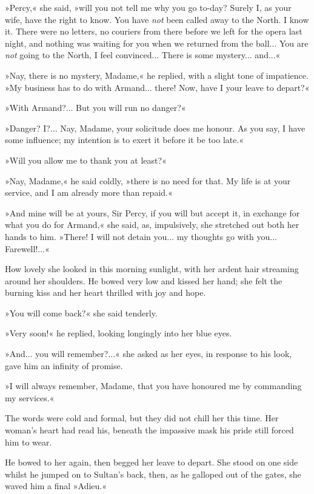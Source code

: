 »Percy,« she said, »will you not tell me why you go to-day? Surely I, as your wife, have the right to know. You have \textit{not} been called away to the North. I know it. There were no letters, no couriers from there before we left for the opera last night, and nothing was waiting for you when we returned from the ball... You are \textit{not} going to the North, I feel convinced... There is some mystery... and...«

»Nay, there is no mystery, Madame,« he replied, with a slight tone of impatience. »My business has to do with Armand... there! Now, have I your leave to depart?«

»With Armand?... But you will run no danger?«

»Danger? I?... Nay, Madame, your solicitude does me honour. As you say, I have some influence; my intention is to exert it before it be too late.«

»Will you allow me to thank you at least?«

»Nay, Madame,« he said coldly, »there is no need for that. My life is at your service, and I am already more than repaid.«

»And mine will be at yours, Sir Percy, if you will but accept it, in exchange for what you do for Armand,« she said, as, impulsively, she stretched out both her hands to him. »There! I will not detain you... my thoughts go with you... Farewell!...«

How lovely she looked in this morning sunlight, with her ardent hair streaming around her shoulders. He bowed very low and kissed her hand; she felt the burning kiss and her heart thrilled with joy and hope.

»You will come back?« she said tenderly.

»Very soon!« he replied, looking longingly into her blue eyes.

»And... you will remember?...« she asked as her eyes, in response to his look, gave him an infinity of promise.

»I will always remember, Madame, that you have honoured me by commanding my services.«

The words were cold and formal, but they did not chill her this time. Her woman's heart had read his, beneath the impassive mask his pride still forced him to wear.

He bowed to her again, then begged her leave to depart. She stood on one side whilst he jumped on to Sultan's back, then, as he galloped out of the gates, she waved him a final »Adieu.«


